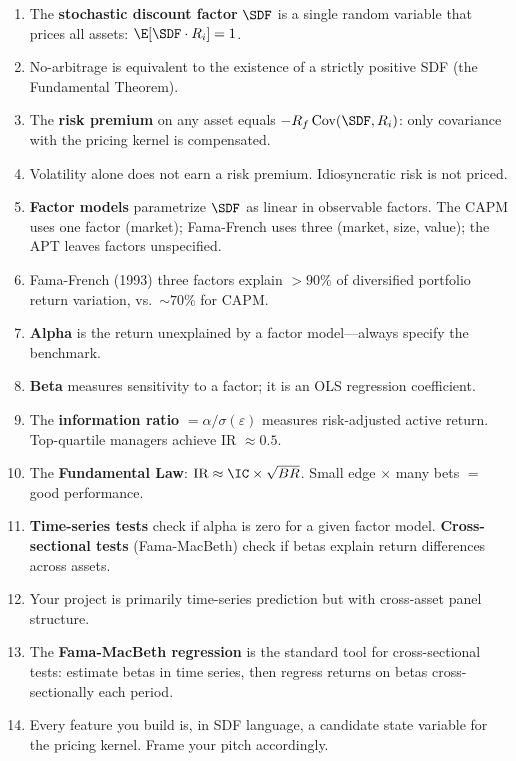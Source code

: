\begin{enumerate}[nosep]
  \item The \textbf{stochastic discount factor} $\SDF$ is a single random variable that prices all assets: $\E[\SDF \cdot R_i] = 1$.
  \item No-arbitrage is equivalent to the existence of a strictly positive SDF (the Fundamental Theorem).
  \item The \textbf{risk premium} on any asset equals $-R_f \, \text{Cov}(\SDF, R_i)$: only covariance with the pricing kernel is compensated.
  \item Volatility alone does not earn a risk premium. Idiosyncratic risk is not priced.
  \item \textbf{Factor models} parametrize $\SDF$ as linear in observable factors. The CAPM uses one factor (market); Fama-French uses three (market, size, value); the APT leaves factors unspecified.
  \item Fama-French (1993) three factors explain $>90\%$ of diversified portfolio return variation, vs.\ ${\sim}70\%$ for CAPM.
  \item \textbf{Alpha} is the return unexplained by a factor model---always specify the benchmark.
  \item \textbf{Beta} measures sensitivity to a factor; it is an OLS regression coefficient.
  \item The \textbf{information ratio} $= \alpha / \sigma(\varepsilon)$ measures risk-adjusted active return. Top-quartile managers achieve IR $\approx 0.5$.
  \item The \textbf{Fundamental Law}: $\text{IR} \approx \IC \times \sqrt{BR}$. Small edge $\times$ many bets $=$ good performance.
  \item \textbf{Time-series tests} check if alpha is zero for a given factor model. \textbf{Cross-sectional tests} (Fama-MacBeth) check if betas explain return differences across assets.
  \item Your project is primarily time-series prediction but with cross-asset panel structure.
  \item The \textbf{Fama-MacBeth regression} is the standard tool for cross-sectional tests: estimate betas in time series, then regress returns on betas cross-sectionally each period.
  \item Every feature you build is, in SDF language, a candidate state variable for the pricing kernel. Frame your pitch accordingly.
\end{enumerate}

